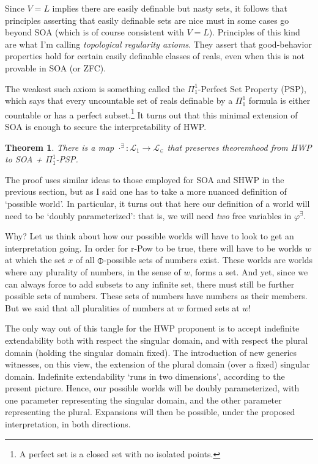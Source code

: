 \documentclass{article}
\newtheorem{theorem}{Theorem}
\begin{document}
Since 
$V = L$ implies there are easily definable but nasty sets, 
it follows that principles asserting 
that easily definable sets are nice must in some cases go beyond SOA (which is 
of course consistent with $V = L$). Principles of this kind 
are what I'm calling \emph{topological 
regularity axioms}. They assert that good-behavior properties hold for 
certain easily definable classes of reals, even when this is not 
provable in SOA (or ZFC). 

The weakest such axiom is something called the
$\Pi_1^1$-Perfect Set Property (PSP), which says that every uncountable set of reals 
definable by a $\Pi_1^1$ formula is either countable or has a perfect subset.\footnote{
    A perfect set is a closed set with no isolated points.
} It turns out that this minimal extension of SOA is enough to secure 
the interpretability of HWP.

\begin{theorem}
    There is a map $\cdot^\exists : \mathcal{L}_1 \to \mathcal{L}_\in$
    that preserves theoremhood from HWP to SOA + $\Pi_1^1$-PSP.
\end{theorem}
The proof uses similar ideas to those employed for SOA and SHWP in the previous 
section, but as I said one has to take a more nuanced definition of `possible world'. 
In particular, it turns out that here our definition of a world will 
need to be `doubly parameterized': that is, we will need \emph{two} free 
variables in $\varphi^\exists$. 

Why?
Let us think about how our possible worlds will have 
to look to get an interpretation going. In order for r-Pow to be true, 
there will have to be worlds $w$ at which the set $x$ 
of all $\circledbar$-possible sets of numbers 
exist. These worlds are worlds where 
any plurality of numbers, in the sense of $w$, forms a set. 
And yet, since we can always force to add subsets to any infinite set, 
there must still be further possible sets of numbers. These sets of numbers 
have numbers as their members. But we said that all pluralities of numbers at 
$w$ formed sets at $w$!

The only way out of this tangle for the HWP proponent is to accept indefinite 
extendability both with respect the singular domain, and with respect the plural 
domain (holding the singular domain fixed). The introduction of new generics 
witnesses, on this view, the extension of the plural domain (over a fixed) singular 
domain. Indefinite extendability `runs in two dimensions', according to the present 
picture. Hence, our possible worlds will be doubly parameterized, with one 
parameter representing the singular domain, and the other parameter representing the
plural. Expansions will then be possible, under the proposed interpretation, in 
both directions. 
\end{document}
